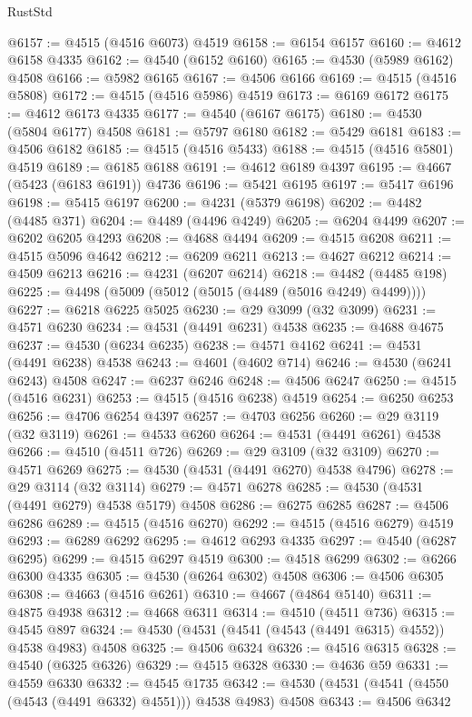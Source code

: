 \begin{lexlean}{RustStd}
\begin{coremodule}
{\begin{coremodule}
{{{{{{{{{{{{{{{{{{{{{{{{{{{{{{{{{{{{{{{{{{{{{{{{{{{{{{{@6157 := @4515 (@4516 @6073) @4519
@6158 := @6154 @6157
@6160 := @4612 @6158 @4335
@6162 := @4540 (@6152 @6160)
@6165 := @4530 (@5989 @6162) @4508
@6166 := @5982 @6165
@6167 := @4506 @6166
@6169 := @4515 (@4516 @5808)
@6172 := @4515 (@4516 @5986) @4519
@6173 := @6169 @6172
@6175 := @4612 @6173 @4335
@6177 := @4540 (@6167 @6175)
@6180 := @4530 (@5804 @6177) @4508
@6181 := @5797 @6180
@6182 := @5429 @6181
@6183 := @4506 @6182
@6185 := @4515 (@4516 @5433)
@6188 := @4515 (@4516 @5801) @4519
@6189 := @6185 @6188
@6191 := @4612 @6189 @4397
@6195 := @4667 (@5423 (@6183 @6191)) @4736
@6196 := @5421 @6195
@6197 := @5417 @6196
@6198 := @5415 @6197
@6200 := @4231 (@5379 @6198)
@6202 := @4482 (@4485 @371)
@6204 := @4489 (@4496 @4249)
@6205 := @6204 @4499
@6207 := @6202 @6205 @4293
@6208 := @4688 @4494
@6209 := @4515 @6208
@6211 := @4515 @5096 @4642
@6212 := @6209 @6211
@6213 := @4627 @6212
@6214 := @4509 @6213
@6216 := @4231 (@6207 @6214)
@6218 := @4482 (@4485 @198)
@6225 := @4498 (@5009 (@5012 (@5015 (@4489 (@5016 @4249) @4499))))
@6227 := @6218 @6225 @5025
@6230 := @29 @3099 (@32 @3099)
@6231 := @4571 @6230
@6234 := @4531 (@4491 @6231) @4538
@6235 := @4688 @4675
@6237 := @4530 (@6234 @6235)
@6238 := @4571 @4162
@6241 := @4531 (@4491 @6238) @4538
@6243 := @4601 (@4602 @714)
@6246 := @4530 (@6241 @6243) @4508
@6247 := @6237 @6246
@6248 := @4506 @6247
@6250 := @4515 (@4516 @6231)
@6253 := @4515 (@4516 @6238) @4519
@6254 := @6250 @6253
@6256 := @4706 @6254 @4397
@6257 := @4703 @6256
@6260 := @29 @3119 (@32 @3119)
@6261 := @4533 @6260
@6264 := @4531 (@4491 @6261) @4538
@6266 := @4510 (@4511 @726)
@6269 := @29 @3109 (@32 @3109)
@6270 := @4571 @6269
@6275 := @4530 (@4531 (@4491 @6270) @4538 @4796)
@6278 := @29 @3114 (@32 @3114)
@6279 := @4571 @6278
@6285 := @4530 (@4531 (@4491 @6279) @4538 @5179) @4508
@6286 := @6275 @6285
@6287 := @4506 @6286
@6289 := @4515 (@4516 @6270)
@6292 := @4515 (@4516 @6279) @4519
@6293 := @6289 @6292
@6295 := @4612 @6293 @4335
@6297 := @4540 (@6287 @6295)
@6299 := @4515 @6297 @4519
@6300 := @4518 @6299
@6302 := @6266 @6300 @4335
@6305 := @4530 (@6264 @6302) @4508
@6306 := @4506 @6305
@6308 := @4663 (@4516 @6261)
@6310 := @4667 (@4864 @5140)
@6311 := @4875 @4938
@6312 := @4668 @6311
@6314 := @4510 (@4511 @736)
@6315 := @4545 @897
@6324 := @4530 (@4531 (@4541 (@4543 (@4491 @6315) @4552)) @4538 @4983) @4508
@6325 := @4506 @6324
@6326 := @4516 @6315
@6328 := @4540 (@6325 @6326)
@6329 := @4515 @6328
@6330 := @4636 @59
@6331 := @4559 @6330
@6332 := @4545 @1735
@6342 := @4530 (@4531 (@4541 (@4550 (@4543 (@4491 @6332) @4551))) @4538 @4983) @4508
@6343 := @4506 @6342
}}}}}}}}}}}}}}}}}}}}}}}}}}}}}}}}}}}}}}}}}}}}}}}}}}}}}}}
\end{coremodule}}
\end{coremodule}
\end{lexlean}
